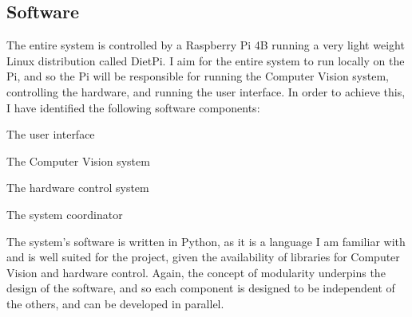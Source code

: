 \subsection{Software}
The entire system is controlled by a Raspberry Pi 4B running a very light weight Linux distribution called DietPi.
I aim for the entire system to run locally on the Pi, and so the Pi will be responsible for running the Computer Vision system,
controlling the hardware, and running the user interface. In order to achieve this, I have identified the following software components:
\begin{mylist}
  \item The user interface
  \item The Computer Vision system
  \item The hardware control system
  \item The system coordinator
\end{mylist}
The system's software is written in Python, as it is a language I am familiar with and is well suited for the project, given the 
availability of libraries for Computer Vision and hardware control. Again, the concept of modularity underpins the design of the software,
and so each component is designed to be independent of the others, and can be developed in parallel.
